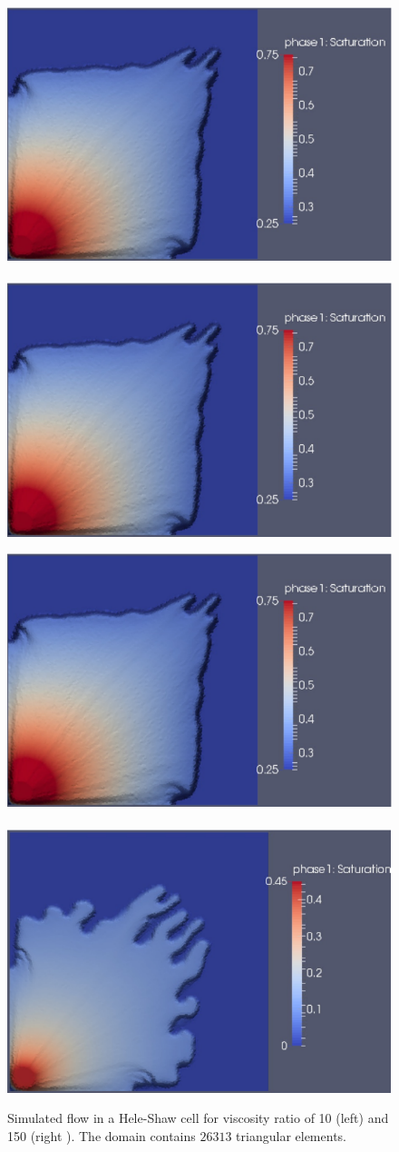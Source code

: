 \begin{landscape}
\begin{figure}[ht] 
\hbox{\includegraphics[width=.75\textwidth]{./Pics1/Saffman_homogeneous_VR10/ST_Homog_VR10_D2201_bbd}
       \includegraphics[width=.75\textwidth]{./Pics1/Saffman_homogeneous_VR10/ST_Homog_VR10_D2201_bbd}}
\caption{Simulated flow in a Hele-Shaw cell for viscosity ratio of 10 (left) and 150 (right ).  The domain contains $26313$  triangular elements.}
\label{fig:homoheleshaw_VN10_VN250}
\hbox{\includegraphics[width=.5\textwidth]{./Pics1/Saffman_homogeneous_VR10/ST_Homog_VR10_D2201_bbd}
       \includegraphics[width=.49\textwidth]{./Pics1/Saffman_homogeneous_VR150/ST_Homog_VR150_D5003_k2b}}

\end{figure}
\end{landscape}

